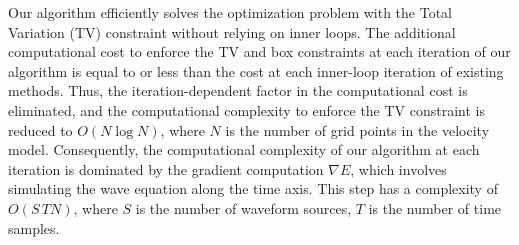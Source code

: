 

Our algorithm efficiently solves the optimization problem with the Total Variation (TV) constraint without relying on inner loops.
The additional computational cost to enforce the TV and box constraints at each iteration of our algorithm is equal to or less than the cost at each inner-loop iteration of existing methods.
Thus, the iteration-dependent factor in the computational cost is eliminated, and the computational complexity to enforce the TV constraint is reduced to $O(N \log N)$, where $N$ is the number of grid points in the velocity model.
Consequently, the computational complexity of our algorithm at each iteration is dominated by the gradient computation $\nabla E$, which involves simulating the wave equation along the time axis.
This step has a complexity of $O(S\, TN)$, where $S$ is the number of waveform sources, $T$ is the number of time samples.
